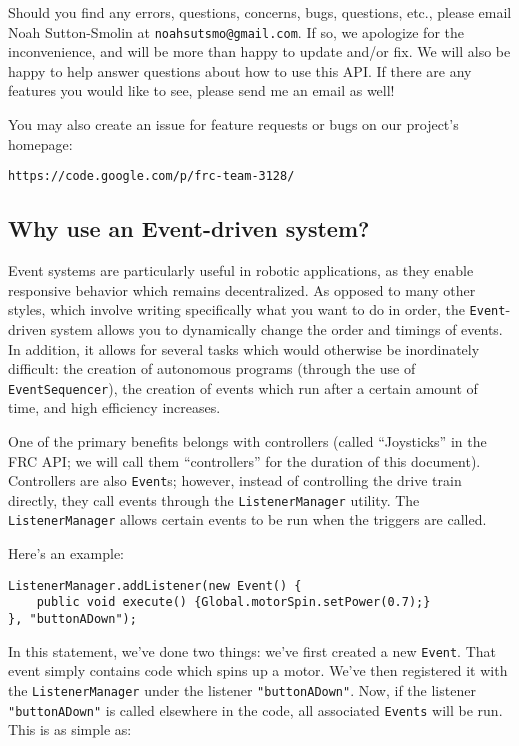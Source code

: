 \documentclass[a4paper]{article}
\begin{document}
Should you find any errors, questions, concerns, bugs, questions, etc., please email Noah Sutton-Smolin at \lstinline{noahsutsmo@gmail.com}. If so, we apologize for the inconvenience, and will be more than happy to update and/or fix. We will also be happy to help answer questions about how to use this API. If there are any features you would like to see, please send me an email as well!

You may also create an issue for feature requests or bugs on our project's homepage:\begin{verbatim}https://code.google.com/p/frc-team-3128/\end{verbatim}

\subsection{Why use an Event-driven system?}

Event systems are particularly useful in robotic applications, as they enable responsive behavior which remains decentralized. As opposed to many other styles, which involve writing specifically what you want to do in order, the \lstinline{Event}-driven system allows you to dynamically change the order and timings of events. In addition, it allows for several tasks which would otherwise be inordinately difficult: the creation of autonomous programs (through the use of \lstinline{EventSequencer}), the creation of events which run after a certain amount of time, and high efficiency increases.

One of the primary benefits belongs with controllers (called ``Joysticks'' in the FRC API; we will call them ``controllers'' for the duration of this document). Controllers are also \lstinline{Event}s; however, instead of controlling the drive train directly, they call events through the \lstinline{ListenerManager} utility. The \lstinline{ListenerManager} allows certain events to be run when the triggers are called. 

Here's an example:

\begin{lstlisting}
ListenerManager.addListener(new Event() {
    public void execute() {Global.motorSpin.setPower(0.7);}
}, "buttonADown");
\end{lstlisting}

In this statement, we've done two things: we've first created a new \lstinline{Event}. That event simply contains code which spins up a motor. We've then registered it with the \lstinline{ListenerManager} under the listener \lstinline{"buttonADown"}. Now, if the listener \lstinline{"buttonADown"} is called elsewhere in the code, all associated \lstinline{Events} will be run. This is as simple as:
\end{document}
